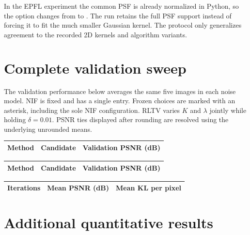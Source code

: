 In the EPFL experiment the common PSF is already normalized in Python, so the option changes from  to . The run retains the full PSF support instead of forcing it to fit the much smaller Gaussian kernel. The protocol only generalizes agreement to the recorded 2D kernels and algorithm variants.

\clearpage
\section{Complete validation sweep}
\label{app:validation}

The validation performance below averages the same five images in each noise model. NIF is fixed and has a single entry. Frozen choices are marked with an asterisk, including the sole NIF configuration. RLTV varies \(K\) and \(\lambda\) jointly while holding \(\delta=0.01\). PSNR ties displayed after rounding are resolved using the underlying unrounded means.

\begin{center}
\small
{}
\begin{tabular}{llr}
\toprule Method & Candidate & Validation PSNR (dB)\\\midrule

\end{tabular}
\end{center}

\clearpage
\begin{center}
\small
{}
\begin{tabular}{llr}
\toprule Method & Candidate & Validation PSNR (dB)\\\midrule

\end{tabular}
\end{center}

\begin{center}
\small
{}
\begin{tabular}{rrr}
\toprule Iterations & Mean PSNR (dB) & Mean KL per pixel\\\midrule

\end{tabular}
\end{center}

\clearpage
\section{Additional quantitative results}
\label{app:additional}


